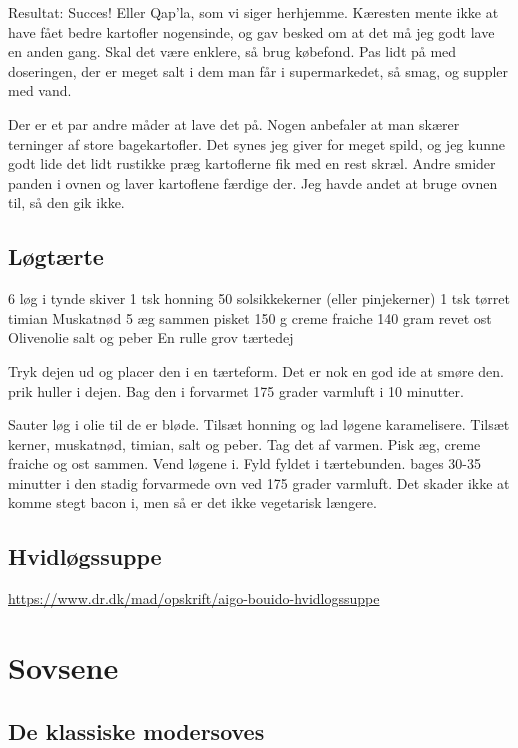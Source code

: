 \documentclass[
]{book}
\begin{document}
Resultat: Succes! Eller Qap'la, som vi siger herhjemme. Kæresten mente ikke at have fået bedre kartofler nogensinde, og gav besked om at det må jeg godt lave en anden gang. Skal det være enklere, så brug købefond. Pas lidt på med doseringen, der er meget salt i dem man får i supermarkedet, så smag, og suppler med vand.

Der er et par andre måder at lave det på. Nogen anbefaler at man skærer terninger af store bagekartofler. Det synes jeg giver for meget spild, og jeg kunne godt lide det lidt rustikke præg kartoflerne fik med en rest skræl. Andre smider panden i ovnen og laver kartoflene færdige der. Jeg havde andet at bruge ovnen til, så den gik ikke.

\hypertarget{luxf8gtuxe6rte}{%
\section{Løgtærte}\label{luxf8gtuxe6rte}}

6 løg i tynde skiver
1 tsk honning
50 solsikkekerner (eller pinjekerner)
1 tsk tørret timian
Muskatnød
5 æg sammen pisket
150 g creme fraiche
140 gram revet ost
Olivenolie
salt og peber
En rulle grov tærtedej

Tryk dejen ud og placer den i en tærteform. Det er nok en god ide at smøre den.
prik huller i dejen.
Bag den i forvarmet 175 grader varmluft i 10 minutter.

Sauter løg i olie til de er bløde. Tilsæt honning og lad løgene karamelisere.
Tilsæt kerner, muskatnød, timian, salt og peber. Tag det af varmen.
Pisk æg, creme fraiche og ost sammen. Vend løgene i.
Fyld fyldet i tærtebunden. bages 30-35 minutter i den stadig forvarmede ovn ved
175 grader varmluft.
Det skader ikke at komme stegt bacon i, men så er det ikke vegetarisk længere.

\hypertarget{hvidluxf8gssuppe}{%
\section{Hvidløgssuppe}\label{hvidluxf8gssuppe}}

\url{https://www.dr.dk/mad/opskrift/aigo-bouido-hvidlogssuppe}

\hypertarget{sovsene}{%
\chapter{Sovsene}\label{sovsene}}

\hypertarget{de-klassiske-modersoves}{%
\section{De klassiske modersoves}\label{de-klassiske-modersoves}}
\end{document}
